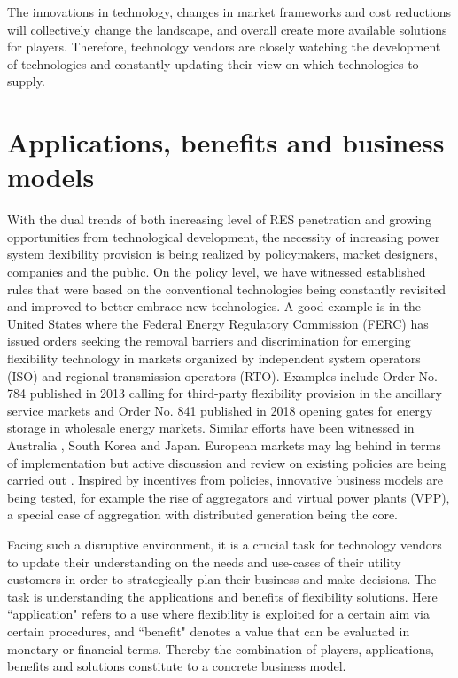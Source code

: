 The innovations in technology, changes in market frameworks and cost reductions will collectively change the landscape, and overall create more available solutions for players. Therefore, technology vendors are closely watching the development of technologies and constantly updating their view on which technologies to supply. 

\section{Applications, benefits and business models}
With the dual trends of both increasing level of RES penetration and growing opportunities from technological development, the necessity of increasing power system flexibility provision is being realized by policymakers, market designers, companies and the public. On the policy level, we have witnessed established rules that were based on the conventional technologies being constantly revisited and improved to better embrace new technologies. A good example is in the United States where the Federal Energy Regulatory Commission (FERC) has issued orders seeking the removal barriers and discrimination for emerging flexibility technology in markets organized by independent system operators (ISO) and regional transmission operators (RTO). Examples include Order No. 784 \cite{FERC784} published in 2013 calling for third-party flexibility provision in the ancillary service markets and Order No. 841 \cite{FERC841} published in 2018 opening gates for energy storage in wholesale energy markets. Similar efforts have been witnessed in Australia \cite{Brown2015,AEMO_DR}, South Korea and Japan\cite{Lipari2017}. European markets may lag behind in terms of implementation but active discussion and review on existing policies are being carried out \cite{ENTSO-E2015,EuropeanCommission2017,Poganietz2017}. Inspired by incentives from policies, innovative business models are being tested, for example the rise of aggregators and virtual power plants (VPP), a special case of aggregation with distributed generation being the core. 

Facing such a disruptive environment, it is a crucial task for technology vendors to update their understanding on the needs and use-cases of their utility customers in order to strategically plan their business and make decisions. The task is understanding the applications and benefits of flexibility solutions.  Here ``application" refers to a use where flexibility is exploited for a certain aim via certain procedures, and ``benefit" denotes a value that can be evaluated in monetary or financial terms. Thereby the combination of players, applications, benefits and solutions constitute to a concrete business model.

